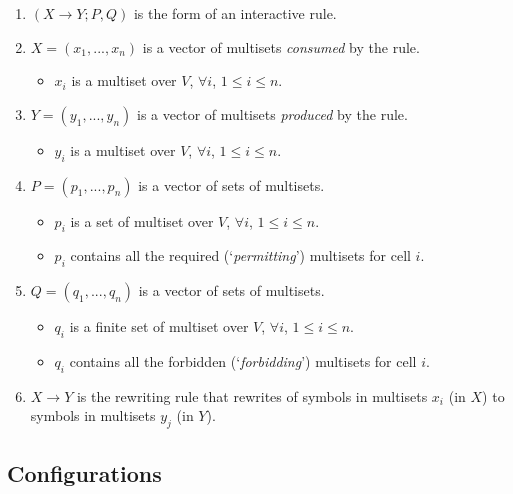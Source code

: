 \documentclass{article}
\begin{document}
\begin{appendices}
\begin{enumerate}
   \item $(X \rightarrow Y; P, Q)$ is the form of an interactive rule.
   \item $X = (x_1,...,x_n)$ is a vector of multisets \emph{consumed} by the rule.
         \begin{itemize}
         \item $x_i$ is a multiset over $V$, $\forall i$, $1 \leq i \leq n$.
         \end{itemize}
   \item $Y = (y_1,...,y_n)$ is a vector of multisets \emph{produced} by the rule.
         \begin{itemize}
         \item $y_i$ is a multiset over $V$, $\forall i$, $1 \leq i \leq n$.
         \end{itemize}
   \item $P = (p_1,...,p_n)$ is a vector of sets of multisets. 
         \begin{itemize}
         \item $p_i$ is a set of multiset over $V$, $\forall i$, $1 \leq i \leq n$.
         \item $p_i$ contains all the required (`\emph{permitting}') multisets for cell $i$. 
         \end{itemize}
   \item $Q = (q_1,...,q_n)$ is a vector of sets of multisets.
         \begin{itemize}
         \item $q_i$ is a finite set of multiset over $V$, $\forall i$, $1 \leq i \leq n$.
         \item $q_i$ contains all the forbidden (`\emph{forbidding}') multisets for cell $i$. 
         \end{itemize}
   \item $X \rightarrow Y$ is the rewriting rule that rewrites of symbols in multisets $x_i$
         (in $X$) to symbols in multisets $y_j$ (in $Y$).
\end{enumerate}


\subsection{Configurations} \label{a-ff1-config} 


\end{appendices}
\end{document}
